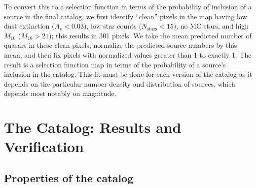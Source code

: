 To convert this to a selection function in terms of the probability of inclusion of a source in the final catalog, we first identify ``clean'' pixels in the map having low dust extinction ($A_v < 0.03$), low star counts ($N_\mathrm{stars} < 15$), no MC stars, and high $M_{10}$ ($M_{10} > 21$); this results in 301 pixels.
We take the mean predicted number of quasars in these clean pixels, normalize the predicted source numbers by this mean, and then fix pixels with normalized values greater than 1 to exactly 1.
The result is a selection function map in terms of the probability of a source's inclusion in the catalog.
This fit must be done for each version of the catalog as it depends on the particular number density and distribution of sources, which depends most notably on magnitude.


\section{The Catalog: Results and Verification}
\label{sec:catalog}

\subsection{Properties of the catalog}
\label{sec:properties}


